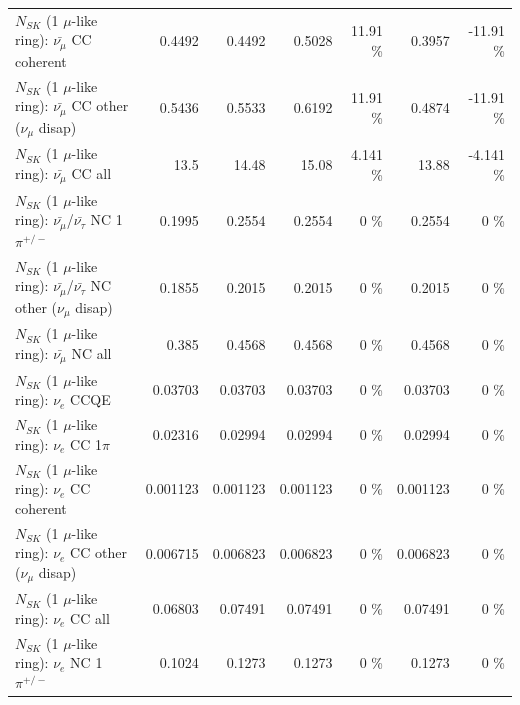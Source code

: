 \begin{table}
\begin{tabular}{| l | r | r | r  r | r  r |}
                       $N_{SK}$ (1 $\mu$-like ring): $\bar{\nu_\mu}$ CC coherent &          0.4492 &          0.4492 &          0.5028 &    11.91 \%  &          0.3957 &   -11.91 \%  \\ 
        $N_{SK}$ (1 $\mu$-like ring): $\bar{\nu_\mu}$ CC other ($\nu_\mu$ disap) &          0.5436 &          0.5533 &          0.6192 &    11.91 \%  &          0.4874 &   -11.91 \%  \\ 
                          $N_{SK}$ (1 $\mu$-like ring): $\bar{\nu_{\mu}}$ CC all &            13.5 &           14.48 &           15.08 &    4.141 \%  &           13.88 &   -4.141 \%  \\ 
\hline
  $N_{SK}$ (1 $\mu$-like ring): $\bar{\nu_\mu}$/$\bar{\nu_\tau}$ NC 1$\pi^{+/-}$ &          0.1995 &          0.2554 &          0.2554 &        0 \%  &          0.2554 &        0 \%  \\ 
$N_{SK}$ (1 $\mu$-like ring): $\bar{\nu_\mu}$/$\bar{\nu_\tau}$ NC other ($\nu_\mu$ disap) &          0.1855 &          0.2015 &          0.2015 &        0 \%  &          0.2015 &        0 \%  \\ 
                          $N_{SK}$ (1 $\mu$-like ring): $\bar{\nu_{\mu}}$ NC all &           0.385 &          0.4568 &          0.4568 &        0 \%  &          0.4568 &        0 \%  \\ 
\hline
\hline
\hline
                                      $N_{SK}$ (1 $\mu$-like ring): $\nu_e$ CCQE &         0.03703 &         0.03703 &         0.03703 &        0 \%  &         0.03703 &        0 \%  \\ 
                                 $N_{SK}$ (1 $\mu$-like ring): $\nu_e$ CC 1$\pi$ &         0.02316 &         0.02994 &         0.02994 &        0 \%  &         0.02994 &        0 \%  \\ 
                               $N_{SK}$ (1 $\mu$-like ring): $\nu_e$ CC coherent &        0.001123 &        0.001123 &        0.001123 &        0 \%  &        0.001123 &        0 \%  \\ 
                $N_{SK}$ (1 $\mu$-like ring): $\nu_e$ CC other ($\nu_\mu$ disap) &        0.006715 &        0.006823 &        0.006823 &        0 \%  &        0.006823 &        0 \%  \\ 
                                  $N_{SK}$ (1 $\mu$-like ring): $\nu_{e}$ CC all &         0.06803 &         0.07491 &         0.07491 &        0 \%  &         0.07491 &        0 \%  \\ 
\hline
                           $N_{SK}$ (1 $\mu$-like ring): $\nu_e$ NC 1$\pi^{+/-}$ &          0.1024 &          0.1273 &          0.1273 &        0 \%  &          0.1273 &        0 \%  \\ 

\end{tabular}
\end{table}
